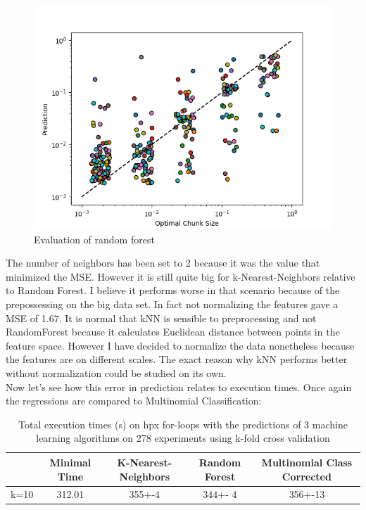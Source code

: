 \begin{figure}[H]
	\centering
	\includegraphics[width=120mm]{images/RFR_eval_big.png}
	\caption{Evaluation of random forest}
\end{figure}

The number of neighbors has been set to 2 because it was the value that minimized the MSE. However it is still quite big for k-Nearest-Neighbors relative to Random Forest. I believe it performs worse in that scenario because of the prepossessing on the big data set. In fact not normalizing the features gave a MSE of 1.67. It is normal that kNN is sensible to preprocessing and not RandomForest because it calculates Euclidean distance between points in the feature space. However I have decided to normalize the data nonetheless because the features are on different scales. The exact reason why kNN performs better without normalization could be studied on its own.
\\

Now let's see how this error in prediction relates to execution times. Once again the regressions are compared to Multinomial Classification:


\begin{table}[h]
	\centering
	\caption{Total execution times (s) on hpx for-loops with the predictions of 3 machine learning algorithms on 278 experiments using k-fold cross validation}
	\label{my-label}
	\begin{tabular}{|c|c|c|c|c|}
		\hline
		& Minimal Time&K-Nearest-Neighbors & Random Forest &Multinomial Class Corrected\\ \hline
		k=10  &312.01&
		 355+-4        & 344+- 4&356+-13 \\ \hline
	\end{tabular}
\end{table}

